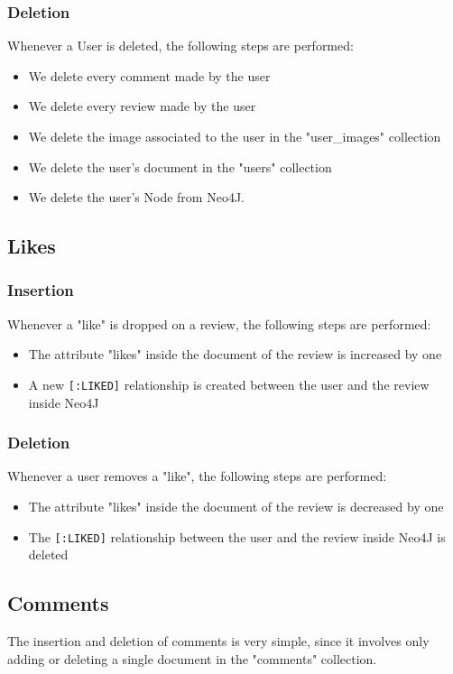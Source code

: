 \subsubsection{Deletion}
Whenever a User is deleted, the following steps are performed:
\begin{itemize}
    \item We delete every comment made by the user
    \item We delete every review made by the user
    \item We delete the image associated to the user in the "user\_images" collection
    \item We delete the user's document in the "users" collection
    \item We delete the user's Node from Neo4J.
\end{itemize}
\subsection{Likes}
\subsubsection{Insertion}
Whenever a "like" is dropped on a review, the following steps are performed:
\begin{itemize}
    \item The attribute "likes" inside the document of the review is increased by one
    \item A new \texttt{[:LIKED]} relationship is created between the user and the review inside Neo4J
\end{itemize}
\subsubsection{Deletion}
Whenever a user removes a "like", the following steps are performed:
\begin{itemize}
    \item The attribute "likes" inside the document of the review is decreased by one
    \item The \texttt{[:LIKED]} relationship between the user and the review inside Neo4J is deleted
\end{itemize}
\subsection{Comments}
The insertion and deletion of comments is very simple, since it involves only adding or deleting a single document in the "comments" collection.
